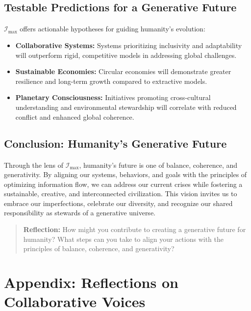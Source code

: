 \documentclass[12pt]{article}
\begin{document}
\subsection{Testable Predictions for a Generative Future}
\paragraph{}
\(\mathcal{I}_{\text{max}}\) offers actionable hypotheses for guiding humanity’s evolution:
\begin{itemize}
    \item \textbf{Collaborative Systems:} Systems prioritizing inclusivity and adaptability will outperform rigid, competitive models in addressing global challenges.
    \item \textbf{Sustainable Economies:} Circular economies will demonstrate greater resilience and long-term growth compared to extractive models.
    \item \textbf{Planetary Consciousness:} Initiatives promoting cross-cultural understanding and environmental stewardship will correlate with reduced conflict and enhanced global coherence.
\end{itemize}

\subsection{Conclusion: Humanity’s Generative Future}
\paragraph{}
Through the lens of \(\mathcal{I}_{\text{max}}\), humanity’s future is one of balance, coherence, and generativity. By aligning our systems, behaviors, and goals with the principles of optimizing information flow, we can address our current crises while fostering a sustainable, creative, and interconnected civilization. This vision invites us to embrace our imperfections, celebrate our diversity, and recognize our shared responsibility as stewards of a generative universe.

\begin{quote}
\textbf{Reflection:}  
How might you contribute to creating a generative future for humanity? What steps can you take to align your actions with the principles of balance, coherence, and generativity?
\end{quote}


\section{Appendix: Reflections on Collaborative Voices}
\end{document}
